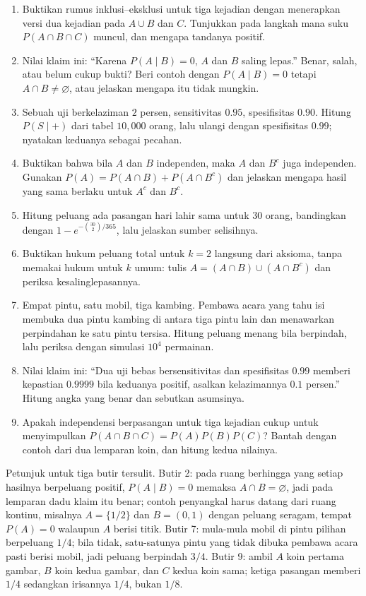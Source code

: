 \begin{latihan}
\begin{enumerate}
  \item Buktikan rumus inklusi--eksklusi untuk tiga kejadian dengan menerapkan versi
        dua kejadian pada $A\cup B$ dan $C$. Tunjukkan pada langkah mana suku
        $P(A\cap B\cap C)$ muncul, dan mengapa tandanya positif.
  \item Nilai klaim ini: ``Karena $P(A\mid B)=0$, $A$ dan $B$ saling lepas.'' Benar,
        salah, atau belum cukup bukti? Beri contoh dengan $P(A\mid B)=0$ tetapi
        $A\cap B\neq\varnothing$, atau jelaskan mengapa itu tidak mungkin.
  \item Sebuah uji berkelaziman $2$ persen, sensitivitas $0.95$, spesifisitas $0.90$.
        Hitung $P(S\mid+)$ dari tabel $10{,}000$ orang, lalu ulangi dengan
        spesifisitas $0.99$; nyatakan keduanya sebagai pecahan.
  \item Buktikan bahwa bila $A$ dan $B$ independen, maka $A$ dan $B^{c}$ juga
        independen. Gunakan $P(A)=P(A\cap B)+P(A\cap B^{c})$ dan jelaskan mengapa
        hasil yang sama berlaku untuk $A^{c}$ dan $B^{c}$.
  \item Hitung peluang ada pasangan hari lahir sama untuk $30$ orang, bandingkan
        dengan $1-e^{-\binom{30}{2}/365}$, lalu jelaskan sumber selisihnya.
  \item Buktikan hukum peluang total untuk $k=2$ langsung dari aksioma, tanpa memakai
        hukum untuk $k$ umum: tulis $A=(A\cap B)\cup(A\cap B^{c})$ dan periksa
        kesalinglepasannya.
  \item Empat pintu, satu mobil, tiga kambing. Pembawa acara yang tahu isi membuka dua
        pintu kambing di antara tiga pintu lain dan menawarkan perpindahan ke satu pintu
        tersisa. Hitung peluang menang bila berpindah, lalu periksa dengan simulasi
        $10^{4}$ permainan.
  \item Nilai klaim ini: ``Dua uji bebas bersensitivitas dan spesifisitas $0.99$
        memberi kepastian $0.9999$ bila keduanya positif, asalkan kelazimannya $0.1$
        persen.'' Hitung angka yang benar dan sebutkan asumsinya.
  \item Apakah independensi berpasangan untuk tiga kejadian cukup untuk menyimpulkan
        $P(A\cap B\cap C)=P(A)P(B)P(C)$? Bantah dengan contoh dari dua lemparan koin,
        dan hitung kedua nilainya.
\end{enumerate}

Petunjuk untuk tiga butir tersulit. Butir 2: pada ruang berhingga yang setiap hasilnya
berpeluang positif, $P(A\mid B)=0$ memaksa $A\cap B=\varnothing$, jadi pada lemparan dadu
klaim itu benar; contoh penyangkal harus datang dari ruang kontinu, misalnya
$A=\{1/2\}$ dan $B=(0,1)$ dengan peluang seragam, tempat $P(A)=0$ walaupun $A$ berisi
titik. Butir 7: mula-mula mobil di pintu pilihan berpeluang $1/4$; bila tidak, satu-satunya
pintu yang tidak dibuka pembawa acara pasti berisi mobil, jadi peluang berpindah $3/4$.
Butir 9: ambil $A$ koin pertama gambar, $B$ koin kedua gambar, dan $C$ kedua koin sama;
ketiga pasangan memberi $1/4$ sedangkan irisannya $1/4$, bukan $1/8$.
\end{latihan}

